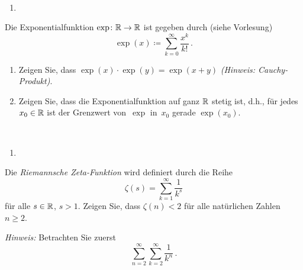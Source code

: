 \bigskip

\begin{lsg}\mbox{ }
\begin{enumerate}[label=$\mathrm{(\roman*)}$, ref=$\mathrm{\roman*}$]
\setlength{\itemsep}{4pt}
\item 
\end{enumerate}
\end{lsg}

\bigskip

\begin{aufg}[6 Punkte]
Die Exponentialfunktion $\exp\colon\mathbb{R}\to\mathbb{R}$ ist gegeben durch (siehe Vorlesung)
\[
\exp(x)\coloneqq \sum_{k=0}^{\infty}\frac{x^k}{k!}\,. 
\]
\begin{enumerate}[label=$\mathrm{(\roman*)}$, ref=$\mathrm{\roman*}$]
\item Zeigen Sie, dass $\exp(x)\cdot \exp(y)=\exp(x+y)$ \emph{(Hinweis: Cauchy-Produkt)}.
\item Zeigen Sie, dass die Exponentialfunktion auf ganz $\mathbb{R}$ stetig ist, d.h., f\"ur jedes~$x_0\in\mathbb{R}$ ist der Grenzwert von~$\exp$ in~$x_0$ gerade $\exp(x_0)$.
\end{enumerate}
\end{aufg}
 
\bigskip

\begin{lsg}\mbox{ }
\begin{enumerate}[label=$\mathrm{(\roman*)}$, ref=$\mathrm{\roman*}$]
\item 
\end{enumerate}
\end{lsg}

\bigskip


\begin{aufg}[6 Punkte]
Die \textit{Riemannsche Zeta-Funktion} wird definiert durch die Reihe 
\[
\zeta(s) = \sum_{k=1}^{\infty} \frac{1}{k^{s}}
\]
f\"ur alle $s\in \mathbb{R}$, $s>1$. Zeigen Sie, dass $\zeta(n) < 2$ f\"ur alle nat\"urlichen Zahlen $n\geq 2$. 

\noindent
\emph{Hinweis:} Betrachten Sie zuerst
\[
\sum_{n=2}^{\infty} \sum_{k=2}^{\infty} \frac{1}{k^{n}}\,.
\]
\end{aufg}


\bigskip

